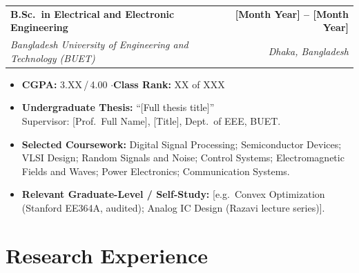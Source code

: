 \documentclass[11pt,letterpaper]{article}   %
\makeatletter
\newcommand{\entry}[4]{%
  \vspace{3pt}%
  \noindent\begin{tabularx}{\textwidth}{@{}X r@{}}
    \textbf{#1} & \textbf{#2}\\
    \textit{\textcolor{subtle}{#3}} & \textit{\textcolor{subtle}{#4}}\\
  \end{tabularx}%
  \vspace{-4pt}%
}
\makeatother
\begin{document}
\entry{B.Sc.\ in Electrical and Electronic Engineering}{[Month Year] -- [Month Year]}
      {Bangladesh University of Engineering and Technology (BUET)}{Dhaka, Bangladesh}
\begin{itemize}
  \item \textbf{CGPA:} 3.XX\,/\,4.00 \quad$\cdot$\quad \textbf{Class Rank:} XX of XXX
  \item \textbf{Undergraduate Thesis:} ``[Full thesis title]''\\
        Supervisor: [Prof.\ Full Name], [Title], Dept.\ of EEE, BUET.
  \item \textbf{Selected Coursework:} Digital Signal Processing; Semiconductor Devices;
        VLSI Design; Random Signals and Noise; Control Systems; Electromagnetic Fields
        and Waves; Power Electronics; Communication Systems.
  \item \textbf{Relevant Graduate-Level / Self-Study:} [e.g.\ Convex Optimization
        (Stanford EE364A, audited); Analog IC Design (Razavi lecture series)].
\end{itemize}

%
\section{Research Experience}
\end{document}
